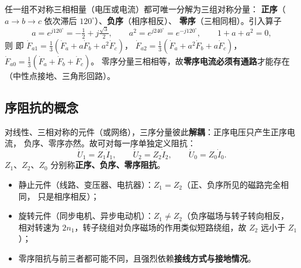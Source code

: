 任一组不对称三相相量（电压或电流）都可唯一分解为三组对称分量：
\textbf{正序}（$a\to b\to c$ 依次滞后 $120^\circ$）、\textbf{负序}（相序相反）、
\textbf{零序}（三相同相）。引入算子
\begin{equation}
  a=e^{j120^\circ}=-\tfrac{1}{2}+j\tfrac{\sqrt{3}}{2},\qquad
  a^{2}=e^{j240^\circ}=e^{-j120^\circ},\qquad 1+a+a^{2}=0,
\end{equation}
则
即 $\dot F_{a1}=\frac{1}{3}(\dot F_a+a\dot F_b+a^{2}\dot F_c)$，
$\dot F_{a2}=\frac{1}{3}(\dot F_a+a^{2}\dot F_b+a\dot F_c)$，
$\dot F_{a0}=\frac{1}{3}(\dot F_a+\dot F_b+\dot F_c)$。
零序分量三相相等，故\textbf{零序电流必须有通路}才能存在（中性点接地、三角形回路）。

\subsection{序阻抗的概念}

对线性、三相对称的元件（或网络），三序分量彼此\textbf{解耦}：正序电压只产生正序电流，
负序、零序亦然。故可对每一序单独定义阻抗：
\begin{equation}
  \dot U_{1}=Z_{1}\dot I_{1},\qquad \dot U_{2}=Z_{2}\dot I_{2},\qquad \dot U_{0}=Z_{0}\dot I_{0}.
\end{equation}
$Z_1$、$Z_2$、$Z_0$ 分别称\textbf{正序、负序、零序阻抗}。
\begin{itemize}
  \item 静止元件（线路、变压器、电抗器）：$Z_1=Z_2$（正、负序所见的磁路完全相同，
        只是相序相反）；
  \item 旋转元件（同步电机、异步电动机）：$Z_1\ne Z_2$（负序磁场与转子转向相反，
        相对转速为 $2n_1$，转子绕组对负序磁场的作用类似短路绕组，故 $Z_2$ 远小于 $Z_1$）；
  \item 零序阻抗与前三者都可能不同，且强烈依赖\textbf{接线方式与接地情况}。
\end{itemize}

